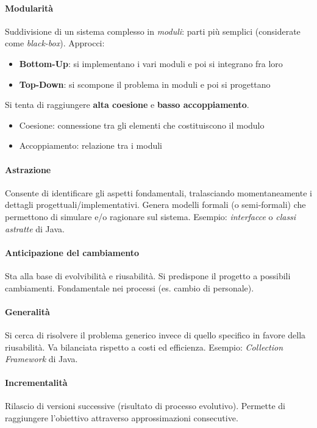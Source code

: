 \paragraph{Modularità} Suddivisione di un sistema complesso in \textit{moduli}: parti più semplici (considerate come \textit{black-box}). Approcci:
\begin{itemize}
    \item \textbf{Bottom-Up}: si implementano i vari moduli e poi si integrano fra loro
    \item \textbf{Top-Down}: si scompone il problema in moduli e poi si progettano
\end{itemize}
Si tenta di raggiungere \textbf{alta coesione} e \textbf{basso accoppiamento}.
\begin{itemize}
    \item Coesione: connessione tra gli elementi che costituiscono il modulo
    \item Accoppiamento: relazione tra i moduli
\end{itemize}

\paragraph{Astrazione} Consente di identificare gli aspetti fondamentali, tralasciando momentaneamente i dettagli progettuali/implementativi. Genera modelli formali (o semi-formali) che permettono di simulare e/o ragionare sul sistema. Esempio: \textit{interfacce} o \textit{classi astratte} di Java.

\paragraph{Anticipazione del cambiamento} Sta alla base di evolvibilità e riusabilità. Si predispone il progetto a possibili cambiamenti. Fondamentale nei processi (es. cambio di personale).

\paragraph{Generalità} Si cerca di risolvere il problema generico invece di quello specifico in favore della riusabilità. Va bilanciata rispetto a costi ed efficienza. Esempio: \textit{Collection Framework} di Java.

\paragraph{Incrementalità} Rilascio di versioni successive (risultato di processo evolutivo). Permette di raggiungere l'obiettivo attraverso approssimazioni consecutive.

